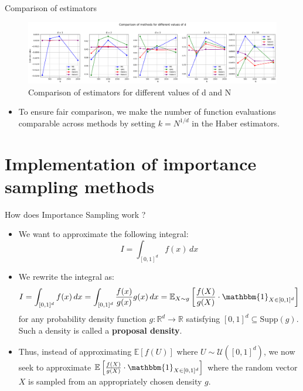 \documentclass[aspectratio=169,xcolor=dvipsnames]{beamer}
\newcommand{\bdOne}{\mathbbm{1}}
\begin{document}
    \begin{frame}{Comparison of estimators}
        \begin{figure}
            \centering
            \includegraphics[width=1\linewidth]{graphs_haber.png}
            \caption{Comparison of estimators for different values of d and N}
            \label{fig:haber}
        \end{figure}

        \begin{itemize}
            \item To ensure fair comparison, we make the number of function evaluations comparable across methods by setting \( k = N^{1/d} \) in the Haber estimators.
        \end{itemize}
    \end{frame}



    \section{Implementation of importance sampling methods}

    \begin{frame}{How does Importance Sampling work ?}
        \begin{itemize}
            \item<1-> We want to approximate the following integral:
            \[I = \int_{[0,1]^d} f(x) \, dx\]

            \item<2-> We rewrite the integral as:
            \[I = \int_{[0,1]^d} f(x) \, dx = \int_{[0,1]^d} \frac{f(x)}{g(x)} g(x) \, dx = \mathbb{E}_{X \sim g} \left[ \frac{f(X)}{g(X)} \cdot \bdOne_{X \in [0,1]^d} \right]\]
            for any probability density function $g : \mathbb{R}^d \to \mathbb R$ satisfying $[0, 1]^d \subseteq \text{Supp}(g)$. Such a density is called a \textbf{proposal density}.

            \item<3-> Thus, instead of approximating $\mathbb{E}[f(U)]$ where $U \sim \mathcal{U}([0, 1]^d)$, we now seek to approximate $\mathbb{E}\left[\frac{f(X)}{g(X)} \cdot \bdOne_{X \in [0,1]^d}\right]$ where the random vector $X$ is sampled from an appropriately chosen density $g$.
        \end{itemize}
    \end{frame}
\end{document}

